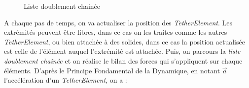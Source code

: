 				\begin{figure}[!htb]
					\centering
					\caption{Liste doublement chainée}
					\label{fig:doubly_linked_list}
				\end{figure}

				A chaque pas de temps, on va actualiser la position des \textit{TetherElement}. Les extrémités peuvent être libres, dans ce cas on les traites comme les autres \textit{TetherElement}, ou bien attachée à des solides, dans ce cas la position actualisée est celle de l'élément auquel l'extrémité est attachée. Puis, on parcours la \textit{liste doublement chaînée} et on réalise le bilan des forces qui s'appliquent sur chaque éléments. D'après le Principe Fondamental de la Dynamique, en notant $\overrightarrow{a}$ l'accélération d'un \textit{TetherElement}, on a :

